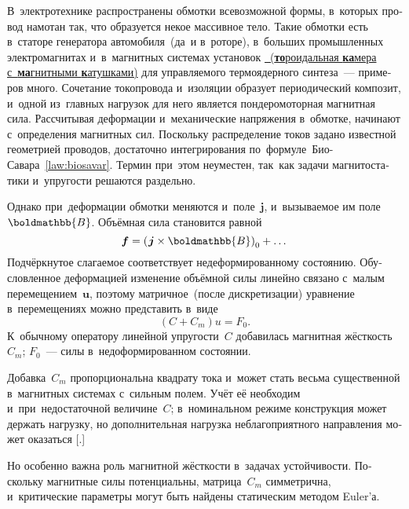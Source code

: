 \begin{otherlanguage}{russian}

В~электротехнике распространены обмотки всевозможной формы, в~которых провод намотан так, что образуется некое массивное тело. Такие обмотки есть в~статоре генератора автомобиля~(да~и в~роторе), в~больших промышленных электромагнитах и~в~магнитных системах установок \href{https://ru.wikipedia.org/wiki/%D0%A2%D0%BE%D0%BA%D0%B0%D0%BC%D0%B0%D0%BA}{\inquotes{токам\'{а}к}~(\textbf{то}роидальная \textbf{ка}мера с~\textbf{ма}гнитными \textbf{к}атушками)} для управляемого термоядерного синтеза~--- примеров много. Сочетание токопровода и~изоляции образует периодический композит, и~одной из~главных нагрузок для него является пондеромоторная магнитная сила. Рассчитывая деформации и~механические напряжения в~обмотке, начинают с~определения магнитных сил. Поскольку распределение токов задано известной геометрией проводов, достаточно интегрирования по~формуле~Био\hbox{-}Савара~\eqref{law:biosavar}. Термин \inquotes{магнитоупругость} при~этом неуместен, так~как задачи магнитостатики и~упругости решаются раздельно.

Однако при~деформации обмотки меняются и~поле~$\bm{j}$, и~вызываемое им поле~$\boldmathbb{B}$. Объёмная сила становится равной
\begin{equation}
\bm{f} = \left( \hspace{0.16ex} \bm{j} \times \boldmathbb{B} \right)_0 + \dots
\end{equation}
\noindent Подчёркнутое слагаемое соответствует недеформированному состоянию. Обусловленное деформацией изменение объёмной силы линейно связано с~малым перемещением~$\bm{u}$, поэтому матричное~(после дискретизации) уравнение в~перемещениях можно представить в~виде
\begin{equation}
\left( C + C_m \right) u = F_0 .
\end{equation}
\noindent К~обычному оператору линейной упругости~$C$ добавилась магнитная жёсткость~$C_m$; $F_0$~--- силы в~недоформированном состоянии.

Добавка~$C_m$ пропорциональна квадрату тока и~может стать весьма существенной в~магнитных системах с~сильным полем. Учёт её необходим и~при~недостаточной величине~$C$; в~номинальном режиме конструкция может держать нагрузку, но дополнительная нагрузка неблагоприятного направления может оказаться [.]

Но особенно важна роль магнитной жёсткости в~задачах устойчивости. Поскольку магнитные силы потенциальны, матрица~$C_m$ симметрична, и~критические параметры могут быть найдены статическим методом Euler’а.


\end{otherlanguage}
